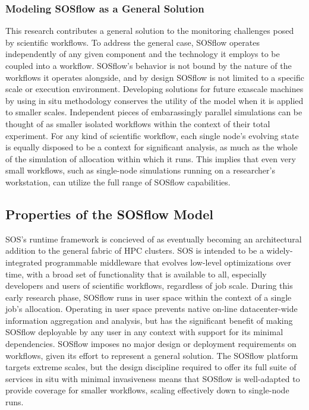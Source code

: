 \subsubsection{Modeling SOSflow as a General Solution}
This research contributes a general solution to the monitoring
challenges posed by scientific workflows.
%
To address the general case, SOSflow operates independently of any
given component and the technology it employs to be coupled into a workflow.
%
SOSflow's behavior is not bound by the nature of the workflows it
operates alongside, and by design SOSflow is not limited to a specific
scale or execution environment.
%
Developing solutions for future exascale machines by using in situ
methodology conserves the utility of the model when it is applied to
smaller scales.
%
Independent pieces of embarassingly parallel simulations can be thought of
as smaller isolated workflows within the context of their total experiment.
%
For any kind of scientific workflow, each single node's evolving state
is equally disposed to be a context for significant analysis, as much as
the whole of the simulation of allocation within which it runs.
%
This implies that even very small workflows, such as single-node simulations
running on a researcher's workstation, can utilize the full range of
SOSflow capabilities.



\subsection{Properties of the SOSflow Model}

SOS's runtime framework is concieved of as eventually becoming an
architectural addition to the general fabric of HPC clusters.
%
SOS is intended to be a widely-integrated programmable middleware that
evolves low-level optimizations over time, with a broad set of
functionality that is available to all, especially developers and
users of scientific workflows, regardless of job scale.
%
During this early research phase, SOSflow runs in user space within
the context of a single job's allocation.
%
Operating in user space prevents native on-line datacenter-wide
information aggregation and analysis, but has the significant benefit
of making SOSflow deployable by any user in any context with support for its
minimal dependencies.
%
SOSflow imposes no major design or deployment requirements on workflows,
given its effort to represent a general solution.
%
The SOSflow platform targets extreme scales, but the design discipline
required to offer its full suite of services in situ with minimal
invasiveness means that SOSflow is well-adapted to provide coverage
for smaller workflows, scaling effectively down to single-node runs.

